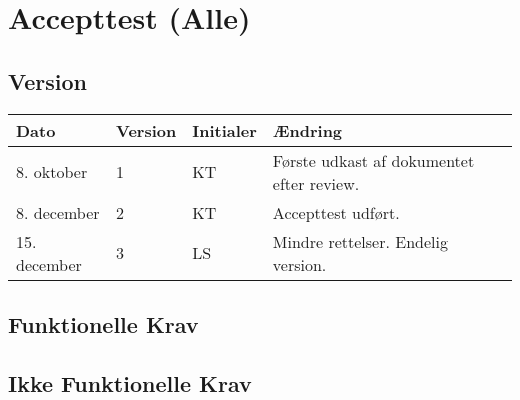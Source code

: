 \chapter{Accepttest (Alle)}\label{chap:acceptt}

\section{Version}
\begin{table}[h]
	\centering
	\begin{tabularx}{\textwidth - 2cm}{|l|l| l|X|}
	\hline
	Dato	& Version	& Initialer & Ændring	\\ \hline
	8. oktober & 1 & KT		& Første udkast af dokumentet efter review. \\ \hline
	8. december & 2 & KT	& Accepttest udført. \\ \hline
	15. december & 3 & LS & Mindre rettelser. Endelig version. \\ \hline
	\end{tabularx}
\end{table}

\section{Funktionelle Krav}
\clearpage




\clearpage



\section{Ikke Funktionelle Krav}

\clearpage